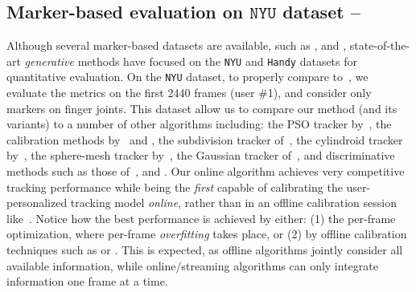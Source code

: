 \subsection{Marker-based evaluation on $\texttt{NYU}$ dataset --
}
\label{sec:evalnyu}
Although several marker-based datasets are available, such as \cite{qian2014realtime}, \cite{sharp2015accurate} and \cite{yuan2017bighand}, state-of-the-art \emph{generative} methods have focused on the \texttt{NYU} \cite{tompson2014real} and \texttt{Handy} \cite{tkach2016sphere} datasets for quantitative evaluation. 
On the \texttt{NYU} dataset, to properly compare to~\cite{taylor2016joint}, we evaluate the metrics on the first 2440 frames (user \#1), and consider only markers on finger joints.
%
This dataset allow us to compare our method (and its variants) to a number of other algorithms including: the PSO tracker by~\cite{sharp2015accurate}, the calibration methods by~\cite{khamis15learning} and \cite{tan2016fits}, the subdivision tracker of~\cite{taylor2016joint}, the cylindroid tracker by~\cite{tagliasacchi2015robust}, the sphere-mesh tracker by~\cite{tkach2016sphere}, the Gaussian tracker of~\cite{sridhar2015fast}, and discriminative methods such as those of~\cite{tompson2014real}, \cite{tang2015opening} and \cite{oberweger2015hands}. 
% 
% 
Our online algorithm achieves very competitive tracking performance while being the \emph{first} capable of calibrating the user-personalized tracking model \emph{online}, rather than in an offline calibration session like~\cite{taylor2016joint}. 
% 
Notice how the best performance is achieved by either: (1) the per-frame optimization, where per-frame \emph{overfitting} takes place, or (2) by offline calibration techniques such as \OfflineSoft{} or \cite{taylor2016joint}. This is expected, as offline algorithms jointly consider all available information, while online/streaming algorithms can only integrate information one frame at a time.



